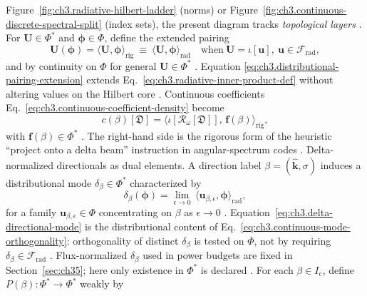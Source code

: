 Figure~\ref{fig:ch3.radiative-hilbert-ladder} (norms) or
Figure~\ref{fig:ch3.continuous-discrete-spectral-split} (index sets), the present diagram tracks
\emph{topological layers} \cite{kato1995}.
For \(\mathbf{U}\in\Phi^{*}\) and \(\boldsymbol{\phi}\in\Phi\), define the extended pairing
\begin{equation}
\label{eq:ch3.distributional-pairing-extension}
\mathbf{U}(\boldsymbol{\phi})
=
\langle \mathbf{U},\boldsymbol{\phi}\rangle_{\mathrm{rig}}
\ \equiv\
\langle \mathbf{U},\boldsymbol{\phi}\rangle_{\mathrm{rad}}
\quad\text{when}\ \mathbf{U}=\iota[\mathbf{u}],\ \mathbf{u}\in\mathcal{F}_{\mathrm{rad}},
\end{equation}
and by continuity on \(\Phi\) for general \(\mathbf{U}\in\Phi^{*}\) \cite{kato1995}. Equation
\eqref{eq:ch3.distributional-pairing-extension} extends
Eq.~\eqref{eq:ch3.radiative-inner-product-def} without altering values on the Hilbert core
\cite{stratton1941}. Continuous coefficients Eq.~\eqref{eq:ch3.continuous-coefficient-density} become
\begin{equation}
\label{eq:ch3.continuous-coefficient-rigged}
c(\beta)[\mathfrak{D}]
=
\big\langle \iota[\mathcal{R}_\omega[\mathfrak{D}]],\,\mathbf{f}(\beta)\big\rangle_{\mathrm{rig}},
\end{equation}
with \(\mathbf{f}(\beta)\in\Phi^{*}\) \cite{harrington2001}. The right-hand side is the
rigorous form of the heuristic ``project onto a delta beam'' instruction in angular-spectrum codes
\cite{jackson1999}.
Delta-normalized directionals as dual elements. A direction label \(\beta=(\hat{\mathbf{k}},\sigma)\) induces a distributional mode
\(\delta_\beta\in\Phi^{*}\) characterized by
\begin{equation}
\label{eq:ch3.delta-directional-mode}
\delta_\beta(\boldsymbol{\phi})
=
\lim_{\epsilon\to 0}\,
\langle \mathbf{u}_{\beta,\epsilon},\boldsymbol{\phi}\rangle_{\mathrm{rad}},
\end{equation}
for a family \(\mathbf{u}_{\beta,\epsilon}\in\Phi\) concentrating on \(\beta\) as \(\epsilon\to 0\)
\cite{stratton1941}. Equation~\eqref{eq:ch3.delta-directional-mode} is the distributional
content of Eq.~\eqref{eq:ch3.continuous-mode-orthogonality}: orthogonality of distinct \(\delta_\beta\)
is tested on \(\Phi\), not by requiring \(\delta_\beta\in\mathcal{F}_{\mathrm{rad}}\)
\cite{harrington2001}. Flux-normalized \(\delta_\beta\) used in power budgets are fixed in
Section~\ref{sec:ch35}; here only existence in \(\Phi^{*}\) is declared \cite{stratton1941}.
For each \(\beta\in I_{\mathrm{c}}\), define \(P(\beta):\Phi^{*}\to\Phi^{*}\) weakly by
